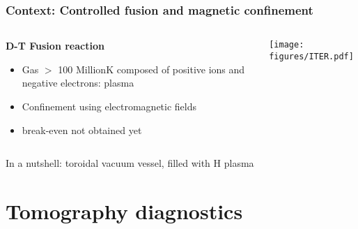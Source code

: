 \documentclass[10pt]{beamer}
\begin{document}
\begin{frame}
\frametitle{Context: Controlled fusion and magnetic confinement}

\begin{columns}
	\begin{column}{0.65\textwidth}
		\begin{center}
		\textbf{D-T Fusion reaction\;\;\;}\vspace{0.3cm}
		\resizebox{0.5\textwidth}{!}{}
		\end{center}
		\vspace{-0.5cm}
		\begin{itemize}%
			\item Gas $>$ 100 Million\degree K composed of positive ions and negative electrons: plasma
			\item Confinement using electromagnetic fields
			\item break-even not obtained yet
		\end{itemize}

	\end{column}

	\begin{column}{0.35\textwidth}
		\texttt{[image: figures/ITER.pdf]}
	\end{column}

\end{columns}

\begin{center}
In a nutshell: toroidal vacuum vessel, filled with H plasma
\end{center}%
\vspace{-0.2cm}
\end{frame}


\section{Tomography diagnostics}
\end{document}
